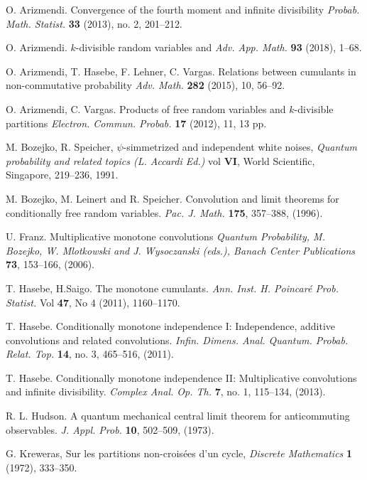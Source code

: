 
\begin{thebibliography}{99}

 O. Arizmendi. Convergence of the fourth moment and infinite divisibility 
\emph{Probab. Math. Statist.} {\bf 33} (2013), no. 2, 201--212.

 O. Arizmendi. $k$-divisible random variables and  
\emph{Adv. App. Math.} {\bf 93} (2018), 1--68.

 O. Arizmendi, T. Hasebe, F. Lehner, C. Vargas. Relations between cumulants in non-commutative probability 
\emph{Adv. Math.} {\bf 282} (2015), 10, 56--92.

 O. Arizmendi, C. Vargas. Products of free random variables and $k$-divisible partitions  
\emph{Electron. Commun. Probab.} {\bf 17} (2012), 11, 13 pp.

 M. Bozejko, R. Speicher, $\psi$-simmetrized and independent white noises, \emph{Quantum probability and related topics (L. Accardi Ed.)} vol {\bf VI}, World Scientific, Singapore, 219--236, 1991.

 M. Bozejko, M. Leinert and R. Speicher. Convolution and limit theorems for conditionally
free random variables. \emph{Pac. J. Math.} {\bf 175}, 357--388, (1996).

 U. Franz. Multiplicative monotone convolutions \emph{Quantum Probability, M. Bozejko, W. Mlotkowski and J. Wysoczanski (eds.), Banach Center Publications} {\bf 73}, 153--166, (2006).

 T. Hasebe, H.Saigo. The monotone cumulants. \emph{Ann. Inst. H. Poincaré Prob. Statist.} Vol {\bf 47}, No 4 (2011), 1160--1170.

 T. Hasebe. Conditionally monotone independence I: Independence, additive convolutions and related convolutions. \emph{Infin. Dimens. Anal. Quantum. Probab. Relat. Top.} {\bf 14}, no. 3, 465--516, (2011).

 T. Hasebe. Conditionally monotone independence II: Multiplicative convolutions and infinite divisibility. \emph{Complex Anal. Op. Th.} {\bf 7}, no. 1, 115--134, (2013).

 R. L. Hudson. A quantum mechanical central limit theorem for anticommuting observables.
\emph{J. Appl. Prob.} {\bf 10}, 502--509, (1973).

 G. Kreweras, Sur les partitions non-croisées d’un cycle, \emph{Discrete Mathematics} {\bf 1} (1972), 333--350.


\end{thebibliography}
